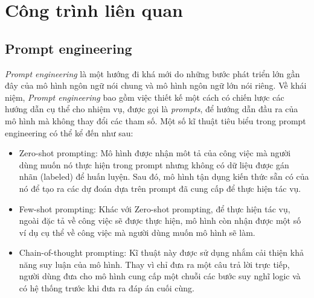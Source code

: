 \chapter{Công trình liên quan}
\section{Prompt engineering}
\emph{Prompt engineering} là một hướng đi khá mới do những bước phát triển lớn gần đây của mô hình ngôn ngữ nói chung và mô hình ngôn ngữ lớn nói riêng. Về khái niệm, \emph{Prompt engineering} bao gồm việc thiết kế một cách có chiến lược các hướng dẫn cụ thể cho nhiệm vụ, được gọi là \emph{prompts}, để hướng dẫn đầu ra của mô hình mà không thay đổi các tham số\cite{sahoo2024systematic}. Một số kĩ thuật tiêu biểu trong prompt engineering có thể kể đến như sau\cite{sahoo2024systematic}:
\begin{itemize}
    \item Zero-shot prompting: Mô hình được nhận môt tả của công việc mà người dùng muốn nó thực hiện trong prompt nhưng không có dữ liệu được gán nhãn (labeled) để huấn luyện. Sau đó, mô hình tận dụng kiến thức sẵn có của nó để tạo ra các dự đoán dựa trên prompt đã cung cấp để thực hiện tác vụ.
    \item Few-shot prompting: Khác với Zero-shot prompting, để thực hiện tác vụ, ngoài đặc tả về công việc sẽ được thực hiện, mô hình còn nhận được một số ví dụ cụ thể về công việc mà người dùng muốn mô hình sẽ làm.
    \item Chain-of-thought prompting\cite{DBLP:journals/corr/abs-2201-11903}: Kĩ thuật này được sử dụng nhắm cải thiện khả năng suy luận của mô hình. Thay vì chỉ đưa ra một câu trả lời trực tiếp, người dùng đưa cho mô hình cung cấp một chuỗi các bước suy nghĩ logic và có hệ thống trước khi đưa ra đáp án cuối cùng.
\end{itemize}
